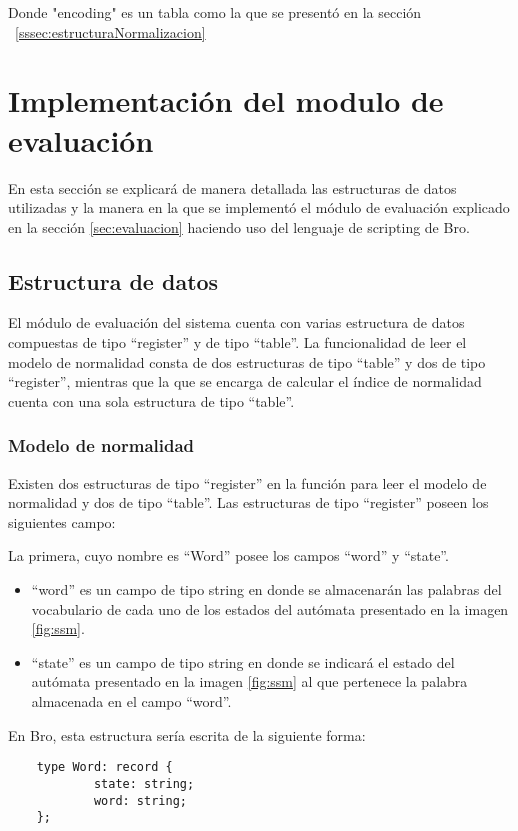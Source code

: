 Donde "encoding" es un tabla como la que se presentó en la sección ~\ref{sssec:estructuraNormalizacion}
        
\section{Implementación del modulo de evaluación}
En esta sección se explicará de manera detallada las estructuras de datos utilizadas y la manera en la que se implementó el módulo de evaluación explicado en la sección \ref{sec:evaluacion}  haciendo uso del lenguaje de scripting de Bro. 


\subsection{Estructura de datos}

El módulo de evaluación del sistema cuenta con varias estructura de datos compuestas de tipo “register” y de tipo “table”. La funcionalidad de leer el modelo de normalidad consta de dos estructuras de tipo “table” y dos de tipo “register”, mientras que la que se encarga de calcular el índice de normalidad cuenta con una sola estructura de tipo “table”.

\subsubsection{Modelo de normalidad}
\label{sssec:estructuraModelo}

Existen dos estructuras de tipo “register” en la función para leer el modelo de normalidad y dos de tipo “table”.
Las estructuras de tipo “register” poseen los siguientes campo:

La primera, cuyo nombre es “Word” posee los campos “word” y  “state”.

\begin{itemize}
\item “word” es un campo de tipo string en donde se almacenarán las palabras del vocabulario de cada uno de los estados del autómata presentado en la imagen \ref{fig:ssm}.
\item “state” es un campo de tipo string en donde se indicará el estado del autómata presentado en la imagen \ref{fig:ssm} al que pertenece la palabra almacenada en el campo “word”.
\end{itemize}

En Bro, esta estructura sería escrita de la siguiente forma:

\begin{verbatim}
    type Word: record {
            state: string;
            word: string;
    };
\end{verbatim}

